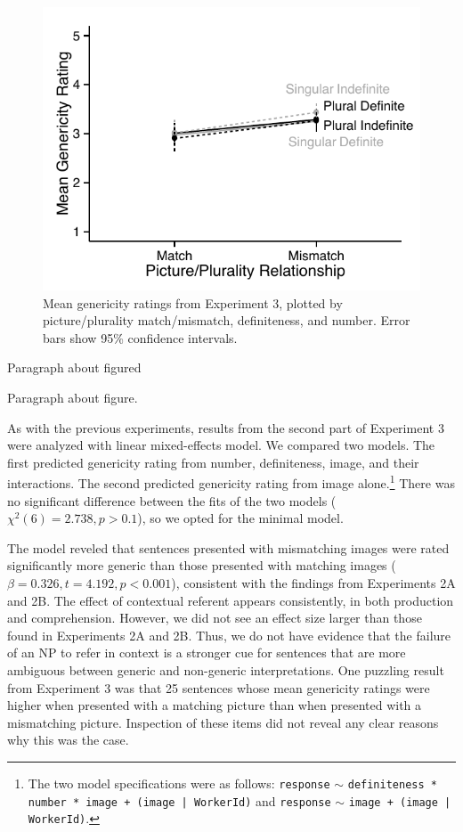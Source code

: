 \documentclass[10pt,letterpaper]{article}
\begin{document}
\begin{figure}[t]
\centering
\includegraphics[width=\linewidth]{figures/e3_mod.pdf}
\caption{\label{fig:e3} Mean genericity ratings from Experiment 3, plotted by picture/plurality match/mismatch, definiteness, and number. Error bars show 95\% confidence intervals.} 
\end{figure}
Paragraph about figured

Paragraph about figure.

As with the previous experiments, results from the second part of Experiment 3 were analyzed with linear mixed-effects model. We compared two models. The first predicted genericity rating from number, definiteness, image, and their interactions. The second predicted genericity rating from image alone.\footnote{The two model specifications were as follows: \texttt{response} \(\sim\) \texttt{definiteness * number * image + (image | WorkerId)} and \texttt{response} \(\sim\) \texttt{image + (image | WorkerId)}.} There was no significant difference between the fits of the two models (\(\chi^2(6) = 2.738, p > 0.1\)), so we opted for the minimal model. 

The model reveled that sentences presented with mismatching images were rated significantly more generic than those presented with matching images (\(\beta = 0.326, t = 4.192, p < 0.001\)), consistent with the findings from Experiments 2A and 2B. The effect of contextual referent appears consistently, in both production and comprehension. However, we did not see an effect size larger than those found in Experiments 2A and 2B. Thus, we do not have evidence that the failure of an NP to refer in context is a stronger cue for sentences that are more ambiguous between generic and non-generic interpretations. One puzzling result from Experiment 3 was that 25 sentences whose mean genericity ratings were higher when presented with a matching picture than when presented with a mismatching picture. Inspection of these items did not reveal any clear reasons why this was the case.
\end{document}
